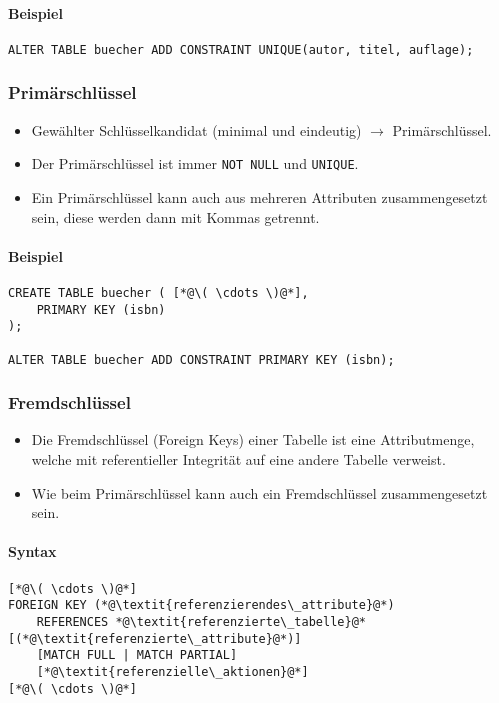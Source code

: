 				\paragraph{Beispiel}
					\begin{lstlisting}
ALTER TABLE buecher ADD CONSTRAINT UNIQUE(autor, titel, auflage);
            		\end{lstlisting}

			\subsubsection{Primärschlüssel} %
				\begin{itemize}
					\item Gewählter Schlüsselkandidat (minimal und eindeutig) \(\rightarrow\) Primärschlüssel.
					\item Der Primärschlüssel ist immer \lstinline|NOT NULL| und \lstinline|UNIQUE|.
					\item Ein Primärschlüssel kann auch aus mehreren Attributen zusammengesetzt sein, diese werden dann mit Kommas getrennt.
				\end{itemize}

				\paragraph{Beispiel}
					\begin{lstlisting}
CREATE TABLE buecher ( [*@\( \cdots \)@*],
	PRIMARY KEY (isbn)
);

ALTER TABLE buecher ADD CONSTRAINT PRIMARY KEY (isbn);
            		\end{lstlisting}

			\subsubsection{Fremdschlüssel} %
				\begin{itemize}
					\item Die Fremdschlüssel (Foreign Keys) einer Tabelle ist eine Attributmenge, welche mit referentieller Integrität auf eine andere Tabelle verweist.
					\item Wie beim Primärschlüssel kann auch ein Fremdschlüssel zusammengesetzt sein.
				\end{itemize}

				\paragraph{Syntax}
					\begin{lstlisting}
[*@\( \cdots \)@*]
FOREIGN KEY (*@\textit{referenzierendes\_attribute}@*)
	REFERENCES *@\textit{referenzierte\_tabelle}@* [(*@\textit{referenzierte\_attribute}@*)]
	[MATCH FULL | MATCH PARTIAL]
	[*@\textit{referenzielle\_aktionen}@*]
[*@\( \cdots \)@*]
            		\end{lstlisting}

